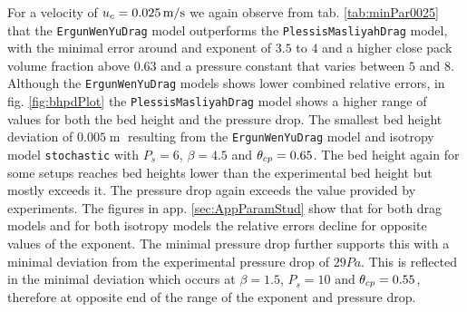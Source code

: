 For a velocity of $u_c = 0.025 \operatorname{m/s}$ we again observe from tab. \ref{tab:minPar0025} that the \lstinline|ErgunWenYuDrag| model outperforms the \lstinline|PlessisMasliyahDrag| model, with the minimal error around and exponent of $3.5$ to $4$ and a higher close pack volume fraction above $0.63$ and a pressure constant that varies between $5$ and $8$.
Although the \lstinline|ErgunWenYuDrag| models shows lower combined relative errors, in fig. \ref{fig:bhpdPlot} the \lstinline|PlessisMasliyahDrag| model shows a higher range of values for both the bed height and the pressure drop.
The smallest bed height deviation of $0.005 \operatorname{m}$ resulting from the \lstinline|ErgunWenYuDrag| model and isotropy model \lstinline|stochastic|
with $P_s = 6$, $\beta = 4.5$ and $\theta_{cp} = 0.65$. %
The bed height again for some setups reaches bed heights lower than the experimental bed height but mostly exceeds it.
The pressure drop again exceeds the value provided by experiments.
The figures in app. \ref{sec:AppParamStud} show that for both drag models and for both isotropy models the relative errors decline for opposite values of the exponent.
The minimal pressure drop further supports this with a minimal deviation from the experimental pressure drop of $29Pa$. This is reflected in the minimal deviation which occurs at $\beta = 1.5$, $P_s = 10$ and $\theta_{cp} = 0.55$, therefore at opposite end of the range of the exponent and pressure drop.


